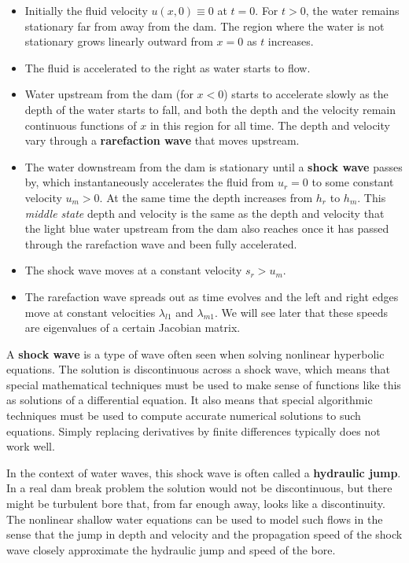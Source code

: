 \documentclass{SIAMbook2016}
\providecommand{\tightlist}{%
      \setlength{\itemsep}{0pt}\setlength{\parskip}{0pt}}
\begin{document}
\begin{itemize}
\tightlist
\item
  Initially the fluid velocity \(u(x,0) \equiv 0\) at \(t=0\). For
  \(t>0\), the water remains stationary far from away from the dam. The
  region where the water is not stationary grows linearly outward from
  \(x=0\) as \(t\) increases.
\item
  The fluid is accelerated to the right as water starts to flow.
\item
  Water upstream from the dam (for \(x<0\)) starts to accelerate slowly
  as the depth of the water starts to fall, and both the depth and the
  velocity remain continuous functions of \(x\) in this region for all
  time. The depth and velocity vary through a \textbf{rarefaction wave}
  that moves upstream.
\item
  The water downstream from the dam is stationary until a \textbf{shock
  wave} passes by, which instantaneously accelerates the fluid from
  \(u_r=0\) to some constant velocity \(u_m >0\). At the same time the
  depth increases from \(h_r\) to \(h_m\). This \emph{middle state}
  depth and velocity is the same as the depth and velocity that the
  light blue water upstream from the dam also reaches once it has passed
  through the rarefaction wave and been fully accelerated.
\item
  The shock wave moves at a constant velocity \(s_r > u_m\).
\item
  The rarefaction wave spreads out as time evolves and the left and
  right edges move at constant velocities \(\lambda_{l1}\) and
  \(\lambda_{m1}\). We will see later that these speeds are eigenvalues
  of a certain Jacobian matrix.
\end{itemize}

A \textbf{shock wave} is a type of wave often seen when solving
nonlinear hyperbolic equations. The solution is discontinuous across a
shock wave, which means that special mathematical techniques must be
used to make sense of functions like this as solutions of a differential
equation. It also means that special algorithmic techniques must be used
to compute accurate numerical solutions to such equations. Simply
replacing derivatives by finite differences typically does not work
well.

In the context of water waves, this shock wave is often called a
\textbf{hydraulic jump}. In a real dam break problem the solution would
not be discontinuous, but there might be turbulent bore that, from far
enough away, looks like a discontinuity. The nonlinear shallow water
equations can be used to model such flows in the sense that the jump in
depth and velocity and the propagation speed of the shock wave closely
approximate the hydraulic jump and speed of the bore.
\end{document}
